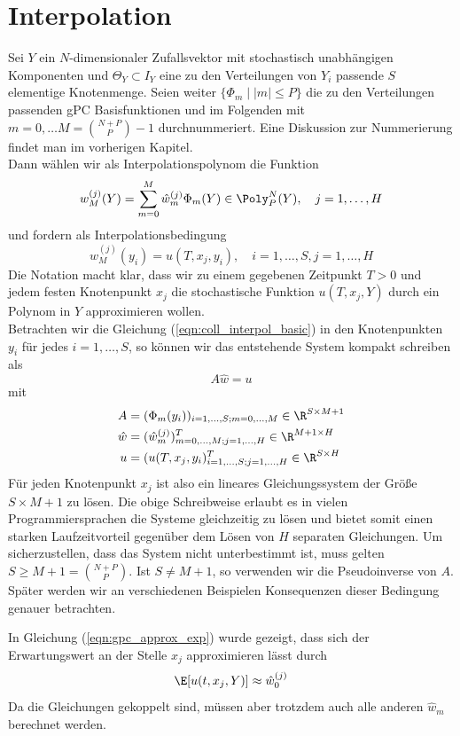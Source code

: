 \section{Interpolation}
Sei $Y$ ein $N$-dimensionaler Zufallsvektor mit stochastisch unabhängigen Komponenten und $\Theta_Y\subset I_Y$ eine zu den Verteilungen von $Y_i$ passende $S$ elementige Knotenmenge. Seien weiter $\lbrace \Phi_m \mid |m|\le P \rbrace$ die zu den Verteilungen passenden gPC Basisfunktionen und im Folgenden mit $m=0,\dots M=\binom{N+P}{P}-1$ durchnummeriert. Eine Diskussion zur Nummerierung findet man im vorherigen Kapitel.\\
Dann wählen wir als Interpolationspolynom die Funktion
\begin{equation}
\label{eqn:coll_interpol_basic}
w_M^{(j)}(Y)=\sum_{m=0}^M\hat{w}_m^{(j)}\Phi_m(Y)\in\Poly_P^N(Y),\quad j=1,\dots,H
\end{equation}
und fordern als Interpolationsbedingung
\[w_M^{(j)}(y_i)=u(T,x_j,y_i),\quad i=1,\dots,S, j=1,\dots,H\]
Die Notation macht klar, dass wir zu einem gegebenen Zeitpunkt $T>0$ und jedem festen Knotenpunkt $x_j$ die stochastische Funktion $u(T,x_j,Y)$ durch ein Polynom in $Y$ approximieren wollen.\\
Betrachten wir die Gleichung (\ref{eqn:coll_interpol_basic}) in den Knotenpunkten $y_i$ für jedes $i=1,\dots,S$, so können wir das entstehende System kompakt schreiben als
\begin{equation}
\label{eqn:interpol_compact}
A\hat{w}=u
\end{equation}
mit 
\begin{align*}
A&=(\Phi_m(y_i))_{i=1,\dots,S;m=0,\dots,M}\in\R^{S\times M+1}\\
\hat{w}&=(\hat{w}_m^{(j)})^T_{m=0,\dots,M;j=1,\dots,H}\in\R^{M+1\times H}\\
u&=(u(T,x_j,y_i)^T_{i=1,\dots,S;j=1,\dots,H}\in\R^{S\times H}\\
\end{align*}
Für jeden Knotenpunkt $x_j$ ist also ein lineares Gleichungssystem der Größe $S\times M+1$ zu lösen. Die obige Schreibweise erlaubt es in vielen Programmiersprachen die Systeme gleichzeitig zu lösen und bietet somit einen starken Laufzeitvorteil gegenüber dem Lösen von $H$ separaten Gleichungen. Um sicherzustellen, dass das System nicht unterbestimmt ist, muss gelten $S\ge M+1=\binom{N+P}{P}$. Ist $S\neq M+1$, so verwenden wir die Pseudoinverse von $A$. Später werden wir an verschiedenen Beispielen Konsequenzen dieser Bedingung genauer betrachten.
\begin{mathbem}
In Gleichung (\ref{eqn:gpc_approx_exp}) wurde gezeigt, dass sich der Erwartungswert an der Stelle $x_j$ approximieren lässt durch
\[\E[u(t,x_j,Y)]\approx \hat{w}_0^{(j)}\]
Da die Gleichungen gekoppelt sind, müssen aber trotzdem auch alle anderen $\hat{w}_m$ berechnet werden.
\end{mathbem}
